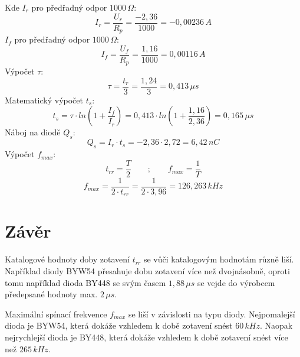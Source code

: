 \documentclass[12pt]{article} %
\begin{document}
Kde $I_r$ pro předřadný odpor $1000\,\Omega$:
\begin{equation}
I_r = \frac{U_r}{R_p} = \frac{-2,36}{1000} = -0,00236\,A
\end{equation}
$I_f$ pro předřadný odpor $1000\,\Omega$:
\begin{equation}
I_f = \frac{U_f}{R_p} = \frac{1,16}{1000} = 0,00116\,A
\end{equation}
Výpočet $\tau$:
\begin{equation}
\tau = \frac{t_r}{3} = \frac{1,24}{3} = 0,413\,\mu s
\end{equation}
Matematický výpočet $t_s$:
\begin{equation}
t_s = \tau\cdot ln\left(1+\frac{I_f}{I_r} \right) = 0,413\cdot ln\left(1+\frac{1,16}{2,36} \right) = 0,165 \,\mu s
\end{equation}
Náboj na diodě $Q_s$:
\begin{equation}
Q_s = I_r\cdot t_s = -2,36\cdot 2,72 = 6,42 \,nC
\end{equation}
Výpočet $f_{max}$:
$$t_{rr} = \frac{T}{2} \qquad ; \qquad f_{max} = \frac{1}{T}$$
\begin{equation}
f_{max} = \frac{1}{2\cdot t_{rr}} = \frac{1}{2\cdot 3,96} = 126,263\,kHz
\end{equation}

\section{Závěr}
Katalogové hodnoty doby zotavení $t_{rr}$ se vůči katalogovým hodnotám různě liší. Například diody BYW54 přesahuje dobu zotavení více než dvojnásobně, oproti tomu například dioda BY448 se svým časem $1,88\,\mu s$ se vejde do výrobcem předepsané hodnoty max. $2\,\mu s$.

Maximální spínací frekvence $f_{max}$ se liší v závislosti na typu diody. Nejpomalejší dioda je BYW54, která dokáže vzhledem k době zotavení snést $60\,kHz$. Naopak nejrychlejší dioda je BY448, která dokáže vzhledem k době zotavení snést více než $265\,kHz$.
\end{document}
